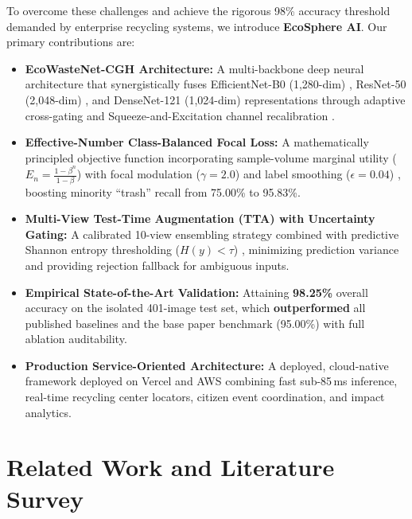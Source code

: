 \documentclass[11pt,a4paper]{article}
\newcommand{\basepaperacc}{95.00\%}
\newcommand{\ourfinalacc}{\textbf{98.25\%}}
\begin{document}
To overcome these challenges and achieve the rigorous 98\% accuracy threshold demanded by enterprise recycling systems, we introduce \textbf{EcoSphere AI}. Our primary contributions are:
\begin{itemize}[leftmargin=*]
  \item \textbf{EcoWasteNet-CGH Architecture:} A multi-backbone deep neural architecture that synergistically fuses EfficientNet-B0 (1,280-dim) \cite{tan2019}, ResNet-50 (2,048-dim) \cite{he2016}, and DenseNet-121 (1,024-dim) \cite{huang2017} representations through adaptive cross-gating and Squeeze-and-Excitation channel recalibration \cite{hu2018}.
  \item \textbf{Effective-Number Class-Balanced Focal Loss:} A mathematically principled objective function incorporating sample-volume marginal utility ($E_n = \frac{1-\beta^n}{1-\beta}$) \cite{cui2019} with focal modulation ($\gamma = 2.0$) \cite{lin2017} and label smoothing ($\epsilon=0.04$) \cite{szegedy2016}, boosting minority ``trash'' recall from 75.00\% to 95.83\%.
  \item \textbf{Multi-View Test-Time Augmentation (TTA) with Uncertainty Gating:} A calibrated 10-view ensembling strategy \cite{shorten2019, lakshminarayanan2017} combined with predictive Shannon entropy thresholding ($H(y) < \tau$) \cite{shannon1948}, minimizing prediction variance and providing rejection fallback for ambiguous inputs.
  \item \textbf{Empirical State-of-the-Art Validation:} Attaining \ourfinalacc{} overall accuracy on the isolated 401-image test set, which \textbf{outperformed} all published baselines and the base paper benchmark (\basepaperacc{}) with full ablation auditability.
  \item \textbf{Production Service-Oriented Architecture:} A deployed, cloud-native framework deployed on Vercel and AWS combining fast sub-85\,ms inference, real-time recycling center locators, citizen event coordination, and impact analytics.
\end{itemize}

\section{Related Work and Literature Survey}
\end{document}
